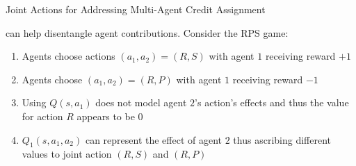 \begin{frame}{Joint Actions for Addressing Multi-Agent Credit Assignment}

 can help disentangle agent contributions. Consider the RPS game:

\centering
\gamerps 

\begin{enumerate}
    \item Agents choose actions $(a_1, a_2) = (R, S)$ with agent $1$ receiving reward $+1$
    \item Agents choose $(a_1, a_2) = (R, P)$ with agent $1$ receiving reward $-1$
    \item Using $Q(s, a_1)$ does not model agent $2$'s action's effects and thus the value for action $R$ appears to be 0
    \item $Q_1(s, a_1, a_2)$ can represent the effect of agent $2$ thus ascribing different values to joint action $(R, S)$ and $(R, P)$
\end{enumerate}

\end{frame}


